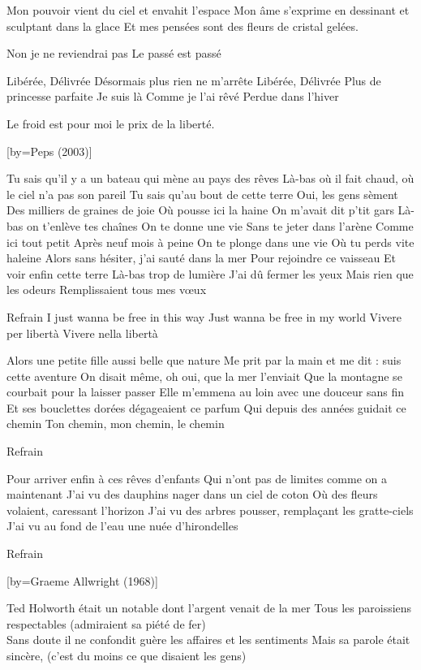 \beginverse
Mon pouvoir vient du ciel et envahit l'espace
Mon âme s'exprime en dessinant et sculptant dans la glace
Et mes pensées sont des fleurs de cristal gelées.
\endverse

\beginverse
Non je ne reviendrai pas
Le passé est passé \!
\endverse

\beginverse
Libérée, Délivrée
Désormais plus rien ne m'arrête
Libérée, Délivrée
Plus de princesse parfaite
Je suis là \!
Comme je l'ai rêvé \!
Perdue dans l'hiver
\endverse

\beginverse
Le froid est pour moi le prix de la liberté.
\endverse

[by={Peps (2003)}]

\beginverse
Tu sais qu’il y a un bateau qui mène au pays des rêves
Là-bas où il fait chaud, où le ciel n’a pas son pareil
Tu sais qu’au bout de cette terre
Oui, les gens sèment
Des milliers de graines de joie
Où pousse ici la haine
On m’avait dit p’tit gars
Là-bas on t’enlève tes chaînes
On te donne une vie
Sans te jeter dans l’arène
Comme ici tout petit
Après neuf mois à peine
On te plonge dans une vie
Où tu perds vite haleine
Alors sans hésiter, j’ai sauté dans la mer
Pour rejoindre ce vaisseau
Et voir enfin cette terre
Là-bas trop de lumière
J’ai dû fermer les yeux
Mais rien que les odeurs
Remplissaient tous mes vœux
\endverse

\beginverse
Refrain
I just wanna be free in this way
Just wanna be free in my world
Vivere per libertà
Vivere nella libertà
\endverse

\beginverse
Alors une petite fille aussi belle que nature
Me prit par la main et me dit : suis cette aventure
On disait même, oh oui, que la mer l’enviait
Que la montagne se courbait pour la laisser passer
Elle m’emmena au loin avec une douceur sans fin
Et ses bouclettes dorées dégageaient ce parfum
Qui depuis des années guidait ce chemin
Ton chemin, mon chemin, le chemin
\endverse

\beginverse
Refrain
\endverse

\beginverse
Pour arriver enfin à ces rêves d’enfants
Qui n’ont pas de limites comme on a maintenant
J’ai vu des dauphins nager dans un ciel de coton
Où des fleurs volaient, caressant l’horizon
J’ai vu des arbres pousser, remplaçant les gratte-ciels
J’ai vu au fond de l’eau une nuée d’hirondelles
\endverse

\beginverse
Refrain
\endverse

[by={Graeme Allwright (1968)}]

\beginverse
Ted Holworth était un notable dont l'argent venait de la mer
Tous les paroissiens respectables (admiraient sa piété de fer) \\[bis]
Sans doute il ne confondit guère les affaires et les sentiments
Mais sa parole était sincère, (c'est du moins ce que disaient les gens) \\[bis]
\endverse

